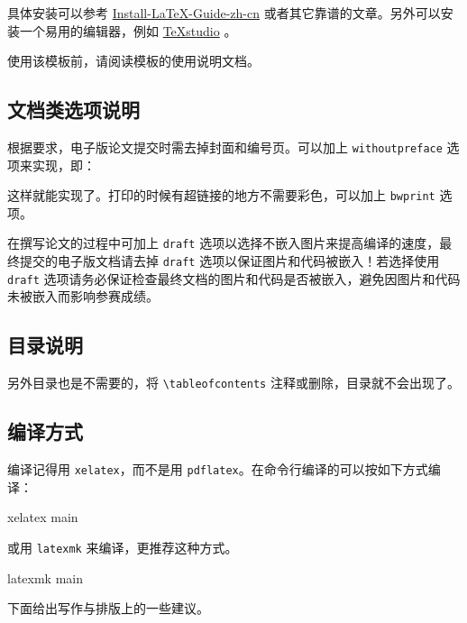 具体安装可以参考 \href{https://github.com/OsbertWang/install-latex-guide-zh-cn/releases/}{Install-LaTeX-Guide-zh-cn} 或者其它靠谱的文章。另外可以安装一个易用的编辑器，例如 \href{https://mirrors.tuna.tsinghua.edu.cn/github-release/texstudio-org/texstudio/LatestRelease/}{\TeX{}studio} 。

使用该模板前，请阅读模板的使用说明文档。

\subsection{文档类选项说明}

根据要求，电子版论文提交时需去掉封面和编号页。可以加上 \verb|withoutpreface|  选项来实现，即：
这样就能实现了。打印的时候有超链接的地方不需要彩色，可以加上 \verb|bwprint| 选项。

在撰写论文的过程中可加上 \verb|draft| 选项以选择不嵌入图片来提高编译的速度，最终提交的电子版文档请去掉 \verb|draft| 选项以保证图片和代码被嵌入！若选择使用 \verb|draft| 选项请务必保证检查最终文档的图片和代码是否被嵌入，避免因图片和代码未被嵌入而影响参赛成绩。

\subsection{目录说明}

另外目录也是不需要的，将 \verb|\tableofcontents| 注释或删除，目录就不会出现了。

\subsection{编译方式}

编译记得用 \verb|xelatex|，而不是用 \verb|pdflatex|。在命令行编译的可以按如下方式编译：
\begin{tcode}
  xelatex main
\end{tcode}
或用 \verb|latexmk| 来编译，更推荐这种方式。
\begin{tcode}
  latexmk main
\end{tcode}

下面给出写作与排版上的一些建议。
